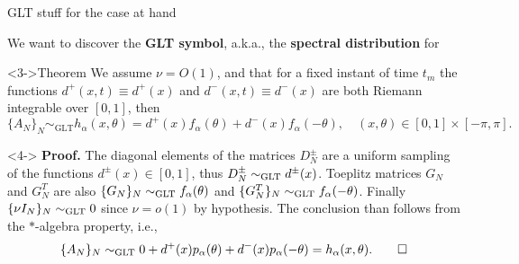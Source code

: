 \documentclass[aspectratio=169,xcolor=dvipsnames]{beamer}
\begin{document}
\begin{frame}{GLT stuff for the case at hand}

We want to discover the \textbf{GLT symbol}, a.k.a., the \textbf{\alert{spectral distribution}} for

\begin{alertblock}<3->{Theorem \parencite{MR3448208}}
We assume $\nu = O(1)$, and that for a fixed instant of time $t_m$ the functions $d^+(x,t) \equiv d^+(x)$ and $d^{-}(x,t) \equiv d^{-}(x)$ are both Riemann integrable over $[0,1]$, then
\[
\{A_N\}_N \sim_{\text{GLT}} h_\alpha(x,\theta) = d^+(x)f_\alpha(\theta) + d^-(x) f_\alpha(-\theta), \quad (x,\theta) \in [0,1]\times[-\pi,\pi].
\]
\end{alertblock}
\begin{onlyenv}<4->
\textbf{Proof.} The diagonal elements of the matrices $D^{\pm}_N$ are a uniform sampling of the functions $d^{\pm}(x) \in [0,1]$, thus $D^{\pm}_N \sim_{\rm GLT} d^{\pm}(x)$. Toeplitz matrices $G_N$ and $G_N^T$ are also $\{G_N\}_N \sim_{\rm GLT} f_\alpha(\theta)$ and $\{G_N^T\}_N \sim_{\rm GLT} f_\alpha(-\theta)$. Finally $\{\nu I_N\}_N \sim_{\rm GLT} 0$ since $\nu = o(1)$ by hypothesis. The conclusion than follows from the $*$-algebra property, i.e.,
\[
\{A_N\}_N \sim_{\rm GLT} 0 + d^+(x) p_\alpha(\theta) + d^{-}(x) p_\alpha(-\theta) = h_\alpha(x,\theta). \hfill \qed
\]
\end{onlyenv}

\end{frame}
\end{document}
